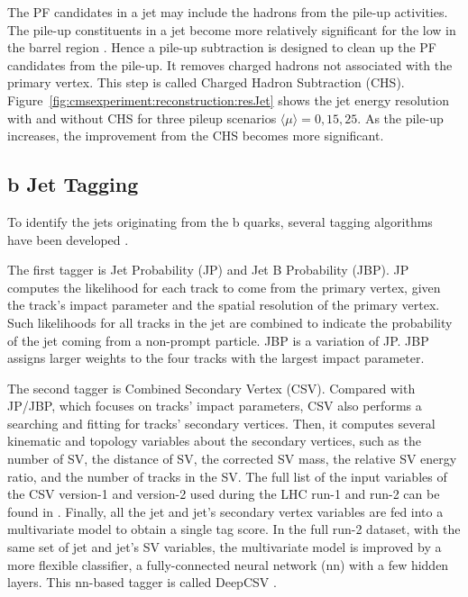 The PF candidates in a jet may include the hadrons from the pile-up activities. The pile-up constituents in a jet become more relatively significant for the low \pt in the barrel region \cite{cms:particleflow:Sirunyan:2017ulk}. Hence a pile-up subtraction is designed to clean up the PF candidates from the pile-up. It removes charged hadrons not associated with the primary vertex. This step is called Charged Hadron Subtraction (CHS). Figure~\ref{fig:cmsexperiment:reconstruction:resJet} shows the jet energy resolution with and without CHS for three pileup scenarios $\langle \mu\rangle =0,15,25$. As the pile-up increases, the improvement from the CHS becomes more significant.  





\subsection{b Jet Tagging}

To identify the jets originating from the b quarks, several tagging algorithms have been developed \cite{Chatrchyan:2012jua, Sirunyan:2017ezt, Bols:2020bkb}. 

The first tagger is Jet Probability (JP) and Jet B Probability (JBP). JP computes the likelihood for each track to come from the primary vertex, given the track's impact parameter and the spatial resolution of the primary vertex. Such likelihoods for all tracks in the jet are combined to indicate the probability of the jet coming from a non-prompt particle. JBP is a variation of JP. JBP assigns larger weights to the four tracks with the largest impact parameter. 

The second tagger is Combined Secondary Vertex (CSV). Compared with JP/JBP, which focuses on tracks' impact parameters, CSV also performs a searching and fitting for tracks' secondary vertices. Then, it computes several kinematic and topology variables about the secondary vertices, such as the number of SV, the distance of SV, the corrected SV mass, the relative SV energy ratio, and the number of tracks in the SV. The full list of the input variables of the CSV version-1 and version-2 used during the LHC run-1 and run-2 can be found in \cite{Sirunyan:2017ezt}. Finally, all the jet and jet's secondary vertex variables are fed into a multivariate model to obtain a single \PQb tag score. In the full run-2 dataset, with the same set of jet and jet's SV variables, the multivariate model is improved by a more flexible classifier, a fully-connected neural network (nn) with a few hidden layers. This nn-based tagger is called DeepCSV \cite{Bols:2020bkb}.


